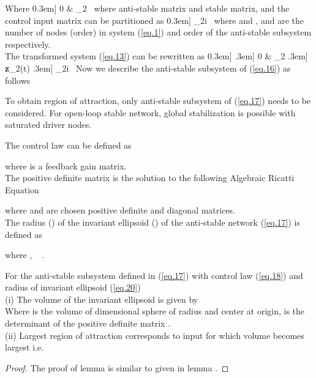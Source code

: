 \documentclass[conference]{IEEEtran}
\begin{document}
   Where
   0.3em]
   0 & _{2}  \
   where  anti-stable matrix and   stable matrix, and the control input matrix  can be partitioned as
   0.3em]
   _{2i}  \
    where  and ,  and  are the number of nodes (order) in system (\ref{eq.1}) and order of the anti-stable subsystem respectively. \\
   The transformed system (\ref{eq.13}) can be rewritten as
   0.3em]
   \frac{d\textbf{z}_{2}(t)}{dt} \0.3em]
   0 & _{2}  \0.3em]
            \textbf{z}_{2}(t) \0.3em]
   \tilde{B}_{2i}  \
   Now we describe the anti-stable subsystem of (\ref{eq.16}) as follows
        
   \begin{rem}
   To obtain region of attraction, only anti-stable subsystem of (\ref{eq.17}) needs to be considered. For open-loop stable network, global stabilization is possible with saturated driver nodes.
   \end{rem}
  The control law  can be defined as
   
   where  is a feedback gain matrix. \\
   The positive definite matrix  is the solution to the following Algebraic Ricatti Equation
    
    where  and  are chosen positive definite and diagonal matrices. \\
    The radius () of the invariant ellipsoid () of the anti-stable network (\ref{eq.17}) is defined as
    
     	where , ~ .
    \begin{lm} For the anti-stable subsystem defined in (\ref{eq.17}) with control law (\ref{eq.18}) and radius of invariant ellipsoid (\ref{eq.20}) \\
           (i) The volume of the invariant ellipsoid is given by \\
           	
                Where  is the volume of dimensional sphere  of radius  and center at origin,  is the determinant of the positive definite matrix . \\
            (ii) Largest region of attraction corresponds to  input for which volume becomes largest i.e. \\
                	
            \end{lm}
            \begin{proof}
            The proof of lemma  is similar to given in lemma .
            \end{proof}
      
\end{document}
